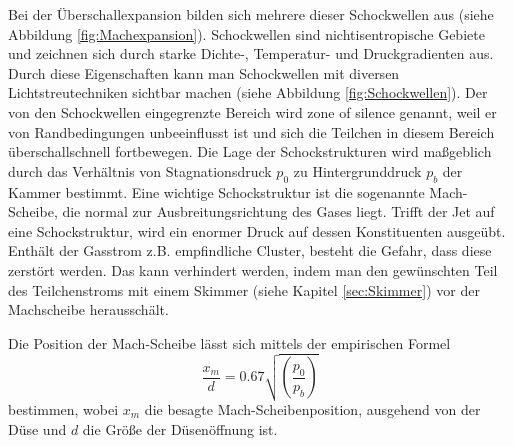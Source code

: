 Bei der Überschallexpansion bilden sich mehrere dieser Schockwellen aus (siehe Abbildung \ref{fig:Machexpansion}). Schockwellen sind nichtisentropische Gebiete und zeichnen sich durch starke Dichte-, Temperatur- und Druckgradienten aus. Durch diese Eigenschaften kann man Schockwellen mit diversen Lichtstreutechniken sichtbar machen \cite{Mou09} (siehe Abbildung \ref{fig:Schockwellen}).
Der von den Schockwellen eingegrenzte Bereich wird zone of silence genannt, weil er von Randbedingungen unbeeinflusst ist und sich die Teilchen in diesem Bereich überschallschnell fortbewegen.
Die Lage der Schockstrukturen wird maßgeblich durch das Verhältnis von Stagnationsdruck $p_0$ zu Hintergrunddruck $p_b$ der Kammer bestimmt. Eine wichtige Schockstruktur ist die sogenannte Mach-Scheibe, die normal zur Ausbreitungsrichtung des Gases liegt. 
% 
Trifft der Jet auf eine Schockstruktur, wird ein enormer Druck auf dessen Konstituenten ausgeübt. Enthält der Gasstrom z.B. empfindliche Cluster, besteht die Gefahr, dass diese zerstört werden. Das kann verhindert werden, indem man den gewünschten Teil des Teilchenstroms mit einem Skimmer (siehe Kapitel \ref{sec:Skimmer}) vor der Machscheibe herausschält.

Die Position der Mach-Scheibe lässt sich mittels der empirischen Formel
\begin{equation} \label{eq:Machscheibe}
\frac{x_m}{d}=0.67 \sqrt{\left( \frac{p_0}{p_b}\right)}
\end{equation}
%
bestimmen, wobei $x_m$ die besagte Mach-Scheibenposition, ausgehend von der Düse und $d$ die Größe der Düsenöffnung ist.



